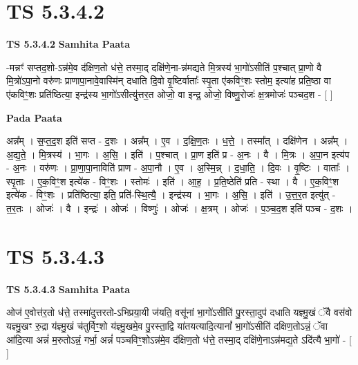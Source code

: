 \documentclass[17pt]{extarticle}
\begin{document}
\section*{ TS 5.3.4.2 }

\textbf{TS 5.3.4.2 } \newline
\textbf{Samhita Paata} \newline

-मन्नꣳ॑ सप्तद॒शो-ऽन्न॑मे॒व द॑क्षिण॒तो ध॑त्ते॒ तस्मा॒द् दक्षि॑णे॒ना-न्न॑मद्यते मि॒त्रस्य॑ भा॒गो॑ऽसीति॑ प॒श्चात् प्रा॒णो वै मि॒त्रो॑ऽपा॒नो वरु॑णः प्राणापा॒नावे॒वास्मि॑न् दधाति दि॒वो वृ॒ष्टिर्वाताः᳚ स्पृ॒ता ए॑कविꣳ॒॒शः स्तोम॒ इत्या॑ह प्रति॒ष्ठा वा ए॑कविꣳ॒॒शः प्रति॑ष्ठित्या॒ इन्द्र॑स्य भा॒गो॑ऽसीत्यु॑त्तर॒त ओजो॒ वा इन्द्र॒ ओजो॒ विष्णु॒रोजः॑ क्ष॒त्रमोजः॑ पञ्चद॒श - [  ] \newline

\textbf{Pada Paata} \newline

अन्न᳚म् । स॒प्त॒द॒श इति॑ सप्त - द॒शः । अन्न᳚म् । ए॒व । द॒क्षि॒ण॒तः । ध॒त्ते॒ । तस्मा᳚त् । दक्षि॑णेन । अन्न᳚म् । अ॒द्य॒ते॒ । मि॒त्रस्य॑ । भा॒गः । अ॒सि॒ । इति॑ । प॒श्चात् । प्रा॒ण इति॑ प्र - अ॒नः । वै । मि॒त्रः । अ॒पा॒न इत्य॑प - अ॒नः । वरु॑णः । प्रा॒णा॒पा॒नाविति॑ प्राण - अ॒पा॒नौ । ए॒व । अ॒स्मि॒न्न् । द॒धा॒ति॒ । दि॒वः । वृ॒ष्टिः । वाताः᳚ । स्पृ॒ताः । ए॒क॒विꣳ॒॒श इत्ये॑क - विꣳ॒॒शः । स्तोमः॑ । इति॑ । आ॒ह॒ । प्र॒ति॒ष्ठेति॑ प्रति - स्था । वै । ए॒क॒विꣳ॒॒श इत्ये॑क - विꣳ॒॒शः । प्रति॑ष्ठित्या॒ इति॒ प्रति॑-स्थि॒त्यै॒ । इन्द्र॑स्य । भा॒गः । अ॒सि॒ । इति॑ । उ॒त्त॒र॒त इत्यु॑त् - त॒र॒तः । ओजः॑ । वै । इन्द्रः॑ । ओजः॑ । विष्णुः॑ । ओजः॑ । क्ष॒त्रम् । ओजः॑ । प॒ञ्च॒द॒श इति॑ पञ्च - द॒शः ।  \newline




\section*{ TS 5.3.4.3 }

\textbf{TS 5.3.4.3 } \newline
\textbf{Samhita Paata} \newline

ओज॑ ए॒वोत्त॑र॒तो ध॑त्ते॒ तस्मा॑दुत्तरतो-ऽभिप्रया॒यी ज॑यति॒ वसू॑नां भा॒गो॑ऽसीति॑ पु॒रस्ता॒दुप॑ दधाति यज्ञ्मु॒खं ॅवै वस॑वो यज्ञ्मु॒खꣳ रु॒द्रा य॑ज्ञ्मु॒खं च॑तुर्विꣳ॒॒शो य॑ज्ञ्मु॒खमे॒व पु॒रस्ता॒द्वि या॑तयत्यादि॒त्यानां᳚ भा॒गो॑ऽसीति॑ दक्षिण॒तोऽन्नं॒ ॅवा आ॑दि॒त्या अन्नं॑ म॒रुतोऽन्नं॒ गर्भा॒ अन्नं॑ पञ्चविꣳ॒॒शोऽन्न॑मे॒व द॑क्षिण॒तो ध॑त्ते॒ तस्मा॒द् दक्षि॑णे॒नाऽन्न॑मद्य॒ते ऽदि॑त्यै भा॒गो॑ - [  ] \newline
\end{document}
